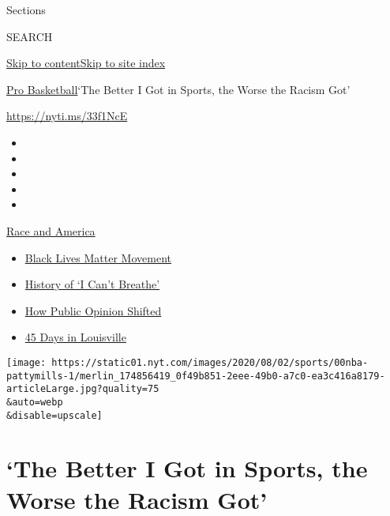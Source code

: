 Sections

SEARCH

\protect\hyperlink{site-content}{Skip to
content}\protect\hyperlink{site-index}{Skip to site index}

\href{/section/sports/basketball}{Pro Basketball}\textbar{}`The Better I
Got in Sports, the Worse the Racism Got'

\url{https://nyti.ms/33f1NcE}

\begin{itemize}
\item
\item
\item
\item
\item
\end{itemize}

\href{https://www.nytimes.com/news-event/george-floyd-protests-minneapolis-new-york-los-angeles?action=click\&pgtype=Article\&state=default\&region=TOP_BANNER\&context=storylines_menu}{Race
and America}

\begin{itemize}
\tightlist
\item
  \href{https://www.nytimes.com/interactive/2020/07/03/us/george-floyd-protests-crowd-size.html?action=click\&pgtype=Article\&state=default\&region=TOP_BANNER\&context=storylines_menu}{Black
  Lives Matter Movement}
\item
  \href{https://www.nytimes.com/interactive/2020/06/28/us/i-cant-breathe-police-arrest.html?action=click\&pgtype=Article\&state=default\&region=TOP_BANNER\&context=storylines_menu}{History
  of `I Can't Breathe'}
\item
  \href{https://www.nytimes.com/interactive/2020/06/10/upshot/black-lives-matter-attitudes.html?action=click\&pgtype=Article\&state=default\&region=TOP_BANNER\&context=storylines_menu}{How
  Public Opinion Shifted}
\item
  \href{https://www.nytimes.com/interactive/2020/07/16/us/black-lives-matter-protests-louisville-breonna-taylor.html?action=click\&pgtype=Article\&state=default\&region=TOP_BANNER\&context=storylines_menu}{45
  Days in Louisville}
\end{itemize}

\texttt{[image: https://static01.nyt.com/images/2020/08/02/sports/00nba-pattymills-1/merlin\_174856419\_0f49b851-2eee-49b0-a7c0-ea3c416a8179-articleLarge.jpg?quality=75\\\&auto=webp\\\&disable=upscale]}

\hypertarget{the-better-i-got-in-sports-the-worse-the-racism-got}{%
\section{`The Better I Got in Sports, the Worse the Racism
Got'}\label{the-better-i-got-in-sports-the-worse-the-racism-got}}

